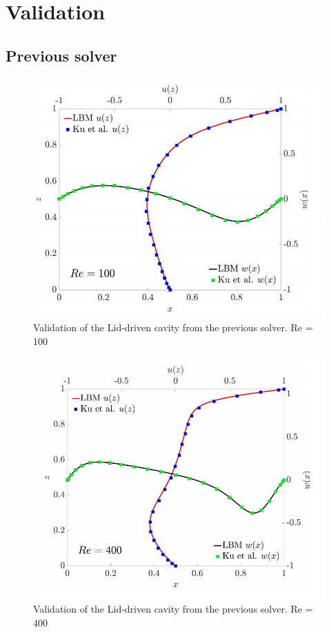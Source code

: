 \documentclass[12pt, openany]{book}
\begin{document}
\chapter{Validation}\label{app:valid}
\section{Previous solver}
  \begin{figure}[H]
  	\centering
  	\includegraphics[width=\linewidth]{Resources/Images/AntonioValid/prevValid1.png}
  	\caption{Validation of the Lid-driven cavity from the previous solver. Re = 100}
  	\label{fig:prevValid1}
  \end{figure}
    \begin{figure}[H]
    	\centering
    	\includegraphics[width=\linewidth]{Resources/Images/AntonioValid/prevValid2.png}
    	\caption{Validation of the Lid-driven cavity from the previous solver. Re = 400}
    	\label{fig:prevValid2}
    \end{figure}
\end{document}
